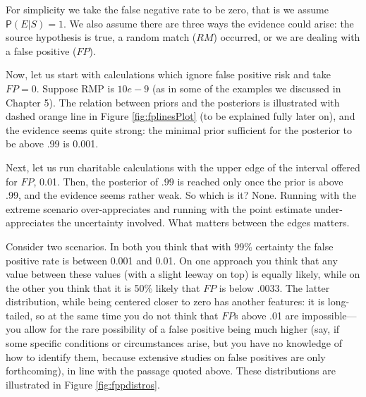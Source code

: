 \documentclass[
  10pt,
  dvipsnames,enabledeprecatedfontcommands]{scrartcl}
\newcommand{\pr}[1]{\mathsf{P}(#1)}
\begin{document}
For simplicity we take the false negative rate to be zero, that is we
assume \(\pr{E\vert S} =1\). We also assume there are three ways the
evidence could arise: the source hypothesis is true, a random match
(\(RM\)) occurred, or we are dealing with a false positive (\(FP\)).

Now, let us start with calculations which ignore false positive risk and
take \(FP=0\). Suppose RMP is \(10e-9\) (as in some of the examples we
discussed in Chapter 5). The relation between priors and the posteriors
is illustrated with dashed orange line in Figure \ref{fig:fplinesPlot}
(to be explained fully later on), and the evidence seems quite strong:
the minimal prior sufficient for the posterior to be above .99 is 0.001.

Next, let us run charitable calculations with the upper edge of the
interval offered for \(FP\), 0.01. Then, the posterior of \(.99\) is
reached only once the prior is above .99, and the evidence seems rather
weak. So which is it? None. Running with the extreme scenario
over-appreciates and running with the point estimate under-appreciates
the uncertainty involved. What matters between the edges matters.

Consider two scenarios. In both you think that with 99\% certainty the
false positive rate is between 0.001 and 0.01. On one approach you think
that any value between these values (with a slight leeway on top) is
equally likely, while on the other you think that it is 50\% likely that
\(FP\) is below .0033. The latter distribution, while being centered
closer to zero has another features: it is long-tailed, so at the same
time you do not think that \(FP\)s above .01 are impossible---you allow
for the rare possibility of a false positive being much higher (say, if
some specific conditions or circumstances arise, but you have no
knowledge of how to identify them, because extensive studies on false
positives are only forthcoming), in line with the passage quoted above.
These distributions are illustrated in Figure \ref{fig:fppdistros}.
\end{document}
